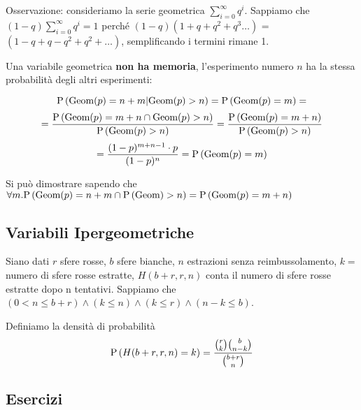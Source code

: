 Osservazione: consideriamo la serie geometrica $ \sum_{i=0}^{\infty} q^i $.
Sappiamo che $ (1-q) \sum_{i=0}^{\infty} q^i = 1 $ perché $ (1-q)(1+q+q^2+q^3\dots) $ = $( 1 - q + q - q^2 + q^2 + \dots )$, semplificando i termini rimane 1.

Una variabile geometrica \textbf{non ha memoria}, l'esperimento numero $ n $ ha la stessa probabilità degli altri esperimenti:

\[ \text{P}\left(\text{Geom}(p) = n+m | \text{Geom}(p) > n\right) = \text{P}\left(\text{Geom}(p) = m\right)  = \]
\[ = \dfrac{\text{P}\left(\text{Geom}(p) = m + n \cap \text{Geom}(p) > n\right)}{\text{P}\left(\text{Geom}(p) > n\right)} = \dfrac{\text{P}\left(\text{Geom}(p) = m+n\right)}{\text{P}\left(\text{Geom}(p) > n\right)}\] 
\[= \dfrac{(1-p)^{m+n-1} \cdot p}{(1-p)^n} = \text{P}\left(\text{Geom}(p) = m\right) \]

Si può dimostrare sapendo che $ \forall m . \text{P}\left(\text{Geom}(p) = n+m \cap \text{P}\left(\text{Geom}\right) > n\right) = \text{P}\left(\text{Geom}(p) = m+n\right) $

\subsection{Variabili Ipergeometriche}

Siano dati $ r $ sfere rosse, $ b $ sfere bianche, $ n $ estrazioni senza reimbussolamento, $ k = $ numero di sfere rosse estratte, $ H(b+r, r, n) $ conta il numero di sfere rosse estratte dopo n tentativi. Sappiamo che $ (0 < n \leq b + r) \land (k \leq n)  \land (k \leq r) \land (n-k \leq b) $.

Definiamo la densità di probabilità
\[ \text{P}\left(H(b+r, r, n) = k\right) = \dfrac{\binom{r}{k} \binom{b}{n-k}}{\binom{b+r}{n}} \] 

\subsection{Esercizi}

